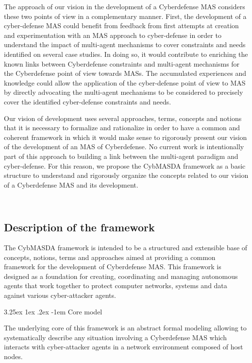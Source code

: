 \documentclass[conference]{IEEEtran}
\makeatletter
\renewcommand\paragraph{\@startsection{paragraph}{5}{\z@}%
  {3.25ex \@plus1ex \@minus.2ex}%
  {-1em}%
  {\normalfont\normalsize\bfseries}}
\makeatother
\begin{document}
The approach of our vision in the development of a Cyberdefense MAS considers these two points of view in a complementary manner. First, the development of a cyber-defense MAS could benefit from feedback from first attempts at creation and experimentation with an MAS approach to cyber-defense in order to understand the impact of multi-agent mechanisms to cover constraints and needs identified on several case studies. In doing so, it would contribute to enriching the known links between Cyberdefense constraints and multi-agent mechanisms for the Cyberdefense point of view towards MASs. The accumulated experiences and knowledge could allow the application of the cyber-defense point of view to MAS by directly advocating the multi-agent mechanisms to be considered to precisely cover the identified cyber-defense constraints and needs.

Our vision of development uses several approaches, terms, concepts and notions that it is necessary to formalize and rationalize in order to have a common and coherent framework in which it would make sense to rigorously present our vision of the development of an MAS of Cyberdefense. No current work is intentionally part of this approach to building a link between the multi-agent paradigm and cyber-defense. For this reason, we propose the CybMASDA framework as a basic structure to understand and rigorously organize the concepts related to our vision of a Cyberdefense MAS and its development.

\

\subsection{Description of the framework}

The CybMASDA framework is intended to be a structured and extensible base of concepts, notions, terms and approaches aimed at providing a common framework for the development of Cyberdefense MAS. This framework is designed as a foundation for creating, coordinating and managing autonomous agents that work together to protect computer networks, systems and data against various cyber-attacker agents.

\paragraph{Core model}

The underlying core of this framework is an abstract formal modeling allowing to systematically describe any situation involving a Cyberdefense MAS which interacts with cyber-attacker agents in a network environment composed of host nodes. 
\end{document}

